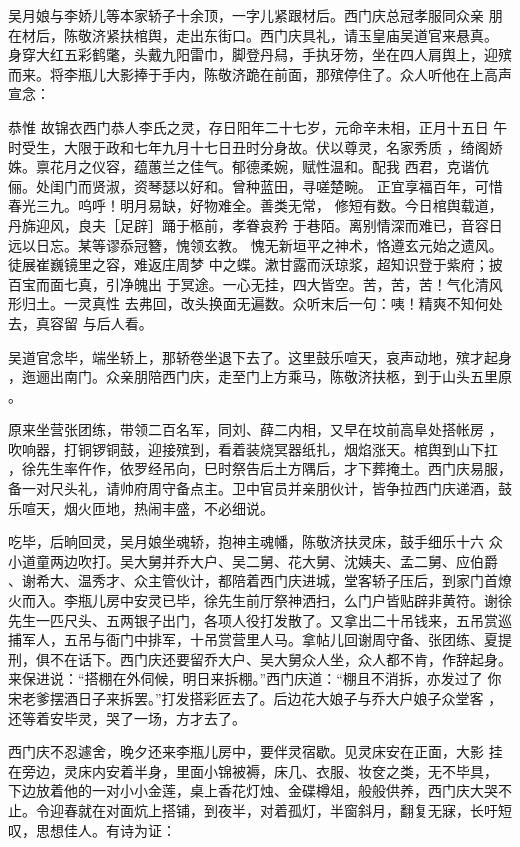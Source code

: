吴月娘与李娇儿等本家轿子十余顶，一字儿紧跟材后。西门庆总冠孝服同众亲
朋在材后，陈敬济紧扶棺舆，走出东街口。西门庆具礼，请玉皇庙吴道官来悬真。
身穿大红五彩鹤氅，头戴九阳雷巾，脚登丹舄，手执牙笏，坐在四人肩舆上，迎殡
而来。将李瓶儿大影捧于手内，陈敬济跪在前面，那殡停住了。众人听他在上高声
宣念：

恭惟
故锦衣西门恭人李氏之灵，存日阳年二十七岁，元命辛未相，正月十五日
午时受生，大限于政和七年九月十七日丑时分身故。伏以尊灵，名家秀质
，绮阁娇姝。禀花月之仪容，蕴蕙兰之佳气。郁德柔婉，赋性温和。配我
西君，克谐伉俪。处闺门而贤淑，资琴瑟以好和。曾种蓝田，寻嗟楚畹。
正宜享福百年，可惜春光三九。呜呼！明月易缺，好物难全。善类无常，
修短有数。今日棺舆载道，丹旆迎风，良夫［足辟］踊于柩前，孝眷哀矜
于巷陌。离别情深而难已，音容日远以日忘。某等谬忝冠簪，愧领玄教。
愧无新垣平之神术，恪遵玄元始之遗风。徒展崔巍镜里之容，难返庄周梦
中之蝶。漱甘露而沃琼浆，超知识登于紫府；披百宝而面七真，引净魄出
于冥途。一心无挂，四大皆空。苦，苦，苦！气化清风形归土。一灵真性
去弗回，改头换面无遍数。众听末后一句：咦！精爽不知何处去，真容留
与后人看。

吴道官念毕，端坐轿上，那轿卷坐退下去了。这里鼓乐喧天，哀声动地，殡才起身
，迤逦出南门。众亲朋陪西门庆，走至门上方乘马，陈敬济扶柩，到于山头五里原
。

原来坐营张团练，带领二百名军，同刘、薛二内相，又早在坟前高阜处搭帐房
，吹响器，打铜锣铜鼓，迎接殡到，看着装烧冥器纸扎，烟焰涨天。棺舆到山下扛
，徐先生率仵作，依罗经吊向，巳时祭告后土方隅后，才下葬掩土。西门庆易服，
备一对尺头礼，请帅府周守备点主。卫中官员并亲朋伙计，皆争拉西门庆递酒，鼓
乐喧天，烟火匝地，热闹丰盛，不必细说。

吃毕，后晌回灵，吴月娘坐魂轿，抱神主魂幡，陈敬济扶灵床，鼓手细乐十六
众小道童两边吹打。吴大舅并乔大户、吴二舅、花大舅、沈姨夫、孟二舅、应伯爵
、谢希大、温秀才、众主管伙计，都陪着西门庆进城，堂客轿子压后，到家门首燎
火而入。李瓶儿房中安灵已毕，徐先生前厅祭神洒扫，么门户皆贴辟非黄符。谢徐
先生一匹尺头、五两银子出门，各项人役打发散了。又拿出二十吊钱来，五吊赏巡
捕军人，五吊与衙门中排军，十吊赏营里人马。拿帖儿回谢周守备、张团练、夏提
刑，俱不在话下。西门庆还要留乔大户、吴大舅众人坐，众人都不肯，作辞起身。
来保进说：“搭棚在外伺候，明日来拆棚。”西门庆道：“棚且不消拆，亦发过了
你宋老爹摆酒日子来拆罢。”打发搭彩匠去了。后边花大娘子与乔大户娘子众堂客
，还等着安毕灵，哭了一场，方才去了。

西门庆不忍遽舍，晚夕还来李瓶儿房中，要伴灵宿歇。见灵床安在正面，大影
挂在旁边，灵床内安着半身，里面小锦被褥，床几、衣服、妆奁之类，无不毕具，
下边放着他的一对小小金莲，桌上香花灯烛、金碟樽俎，般般供养，西门庆大哭不
止。令迎春就在对面炕上搭铺，到夜半，对着孤灯，半窗斜月，翻复无寐，长吁短
叹，思想佳人。有诗为证：

